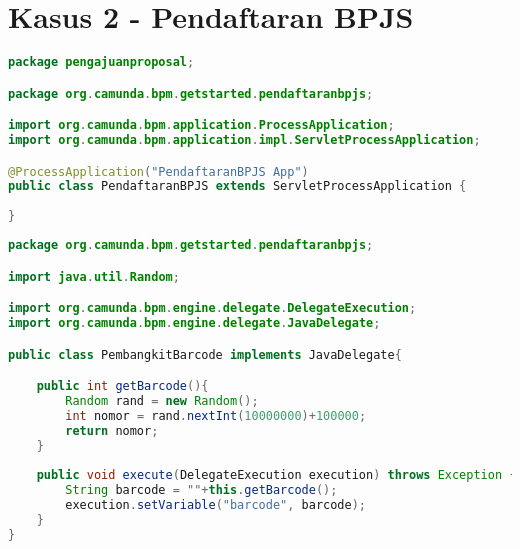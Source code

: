 \section{Kasus 2 - Pendaftaran BPJS}
\label{sec:kode_kasus2}
\begin{lstlisting}[language=Java,basicstyle=\tiny,caption=PendaftaranBPJS.java]
package pengajuanproposal;

package org.camunda.bpm.getstarted.pendaftaranbpjs;

import org.camunda.bpm.application.ProcessApplication;
import org.camunda.bpm.application.impl.ServletProcessApplication;

@ProcessApplication("PendaftaranBPJS App")
public class PendaftaranBPJS extends ServletProcessApplication {
	
}

\end{lstlisting}

\begin{lstlisting}[language=Java,basicstyle=\tiny,caption=PembangkitBarcode.java]
package org.camunda.bpm.getstarted.pendaftaranbpjs;

import java.util.Random;

import org.camunda.bpm.engine.delegate.DelegateExecution;
import org.camunda.bpm.engine.delegate.JavaDelegate;

public class PembangkitBarcode implements JavaDelegate{

	public int getBarcode(){
		Random rand = new Random();
		int nomor = rand.nextInt(10000000)+100000;
		return nomor;
	}
	
	public void execute(DelegateExecution execution) throws Exception {
		String barcode = ""+this.getBarcode();
		execution.setVariable("barcode", barcode);
	}
}

\end{lstlisting}

